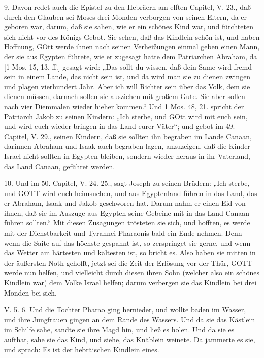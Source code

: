 9. Davon redet auch die Epistel zu den Hebräern am elften Capitel, V. 23., daß durch den Glauben sei Moses drei Monden verborgen von seinen Eltern, da er geboren war, darum, daß sie sahen, wie er ein schönes Kind war, und fürchteten sich nicht vor des Königs Gebot. Sie sehen, daß das Kindlein schön ist, und haben Hoffnung, GOtt werde ihnen nach seinen Verheißungen einmal geben einen Mann, der sie aus Egypten führete, wie er zugesagt hatte dem Patriarchen Abraham, da [1 Mos. 15, 13. ff.] gesagt wird: „Das sollt du wissen, daß dein Same wird fremd sein in einem Lande, das nicht sein ist, und da wird man sie zu dienen zwingen und plagen vierhundert Jahr. Aber ich will Richter sein über das Volk, dem sie dienen müssen, darnach sollen sie ausziehen mit großem Gute. Sie aber sollen nach vier Diemmalen wieder hieher kommen.“ Und 1 Mos. 48, 21. spricht der Patriarch Jakob zu seinen Kindern: „Ich sterbe, und GOtt wird mit euch sein, und wird euch wieder bringen in das Land eurer Väter“; und gebot im 49. Capitel, V. 29., seinen Kindern, daß sie sollten ihn begraben im Lande Canaan, darinnen Abraham und Isaak auch begraben lagen, anzuzeigen, daß die Kinder Israel nicht sollten in Egypten bleiben, sondern wieder heraus in ihr Vaterland, das Land Canaan, geführet werden.

10. Und im 50. Capitel, V. 24. 25., sagt Joseph zu seinen Brüdern: „Ich sterbe, und GOTT wird euch heimsuchen, und aus Egyptenland führen in das Land, das er Abraham, Isaak und Jakob geschworen hat. Darum nahm er einen Eid von ihnen, daß sie im Auszuge aus Egypten seine Gebeine mit in das Land Canaan führen sollten.“ Mit diesen Zusagungen trösteten sie sich, und hofften, es werde mit der Dienstbarkeit und Tyrannei Pharaonis bald ein Ende nehmen. Denn wenn die Saite auf das höchste gespannt ist, so zerspringet sie gerne, und wenn das Wetter am härtesten und kältesten ist, so bricht es. Also haben sie mitten in der äußersten Noth gehofft, jetzt sei die Zeit der Erlösung vor der Thür, GOTT werde nun helfen, und vielleicht durch diesen ihren Sohn (welcher also ein schönes Kindlein war) dem Volke Israel helfen; darum verbergen sie das Kindlein bei drei Monden bei sich.

\begin{schriftzitat}
V. 5. 6. Und die Tochter Pharao ging hernieder, und wollte baden im Wasser, und ihre Jungfrauen gingen an dem Rande des Wassers. Und da sie das Kästlein im Schilfe sahe, sandte sie ihre Magd hin, und ließ es holen. Und da sie es aufthat, sahe sie das Kind, und siehe, das Knäblein weinete. Da jammerte es sie, und sprach: Es ist der hebräischen Kindlein eines.
\end{schriftzitat}

